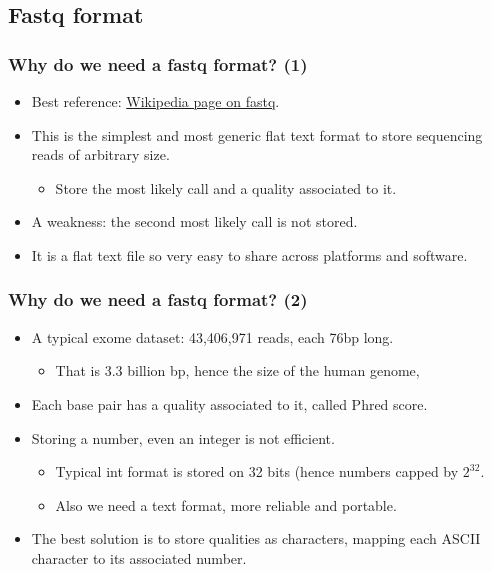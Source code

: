 \documentclass{beamer}
\begin{document}
\subsection{Fastq format}

\begin{frame}
  \frametitle{Why do we need a fastq format? (1)}
  \begin{itemize}
  \item Best reference:  \href{http://en.wikipedia.org/wiki/FASTQ_format}{Wikipedia page on fastq}.
  \item This is the simplest and most generic flat text format to store sequencing reads of arbitrary size.
    \begin{itemize}
    \item Store the most likely call and a quality associated to it.
    \end{itemize}
  \item A weakness: the second most likely call is not stored.
  \item It is a flat text file so very easy to share across platforms and software.
  \end{itemize}
\end{frame}


\begin{frame}
  \frametitle{Why do we need a fastq format? (2)}
  \begin{itemize}
  \item A typical exome dataset: 43,406,971 reads, each 76bp long.
    \begin{itemize}
    \item That is 3.3 billion bp, hence the size of the human genome,
    \end{itemize}
  \item Each base pair has a quality associated to it, called Phred score.
  \item Storing a number, even an integer is not efficient.
    \begin{itemize}
    \item Typical int format is stored on 32 bits (hence numbers capped by $2^{32}$.
    \item Also we need a text format, more reliable and portable.
    \end{itemize}
  \item The best solution is to store qualities as characters, mapping each ASCII character to its associated number.
  \end{itemize}
\end{frame}
\end{document}
